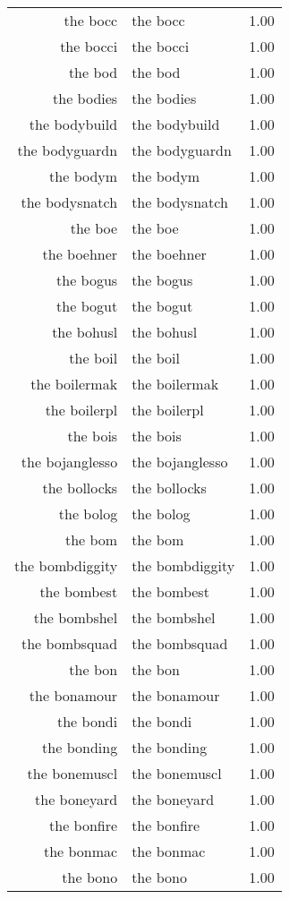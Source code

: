 \begin{table}[ht]
\begin{tabular}{rlr}
  the bocc & the bocc & 1.00 \\ 
  the bocci & the bocci & 1.00 \\ 
  the bod & the bod & 1.00 \\ 
  the bodies & the bodies & 1.00 \\ 
  the bodybuild & the bodybuild & 1.00 \\ 
  the bodyguardn & the bodyguardn & 1.00 \\ 
  the bodym & the bodym & 1.00 \\ 
  the bodysnatch & the bodysnatch & 1.00 \\ 
  the boe & the boe & 1.00 \\ 
  the boehner & the boehner & 1.00 \\ 
  the bogus & the bogus & 1.00 \\ 
  the bogut & the bogut & 1.00 \\ 
  the bohusl & the bohusl & 1.00 \\ 
  the boil & the boil & 1.00 \\ 
  the boilermak & the boilermak & 1.00 \\ 
  the boilerpl & the boilerpl & 1.00 \\ 
  the bois & the bois & 1.00 \\ 
  the bojanglesso & the bojanglesso & 1.00 \\ 
  the bollocks & the bollocks & 1.00 \\ 
  the bolog & the bolog & 1.00 \\ 
  the bom & the bom & 1.00 \\ 
  the bombdiggity & the bombdiggity & 1.00 \\ 
  the bombest & the bombest & 1.00 \\ 
  the bombshel & the bombshel & 1.00 \\ 
  the bombsquad & the bombsquad & 1.00 \\ 
  the bon & the bon & 1.00 \\ 
  the bonamour & the bonamour & 1.00 \\ 
  the bondi & the bondi & 1.00 \\ 
  the bonding & the bonding & 1.00 \\ 
  the bonemuscl & the bonemuscl & 1.00 \\ 
  the boneyard & the boneyard & 1.00 \\ 
  the bonfire & the bonfire & 1.00 \\ 
  the bonmac & the bonmac & 1.00 \\ 
  the bono & the bono & 1.00 \\ 

\end{tabular}
\end{table}
